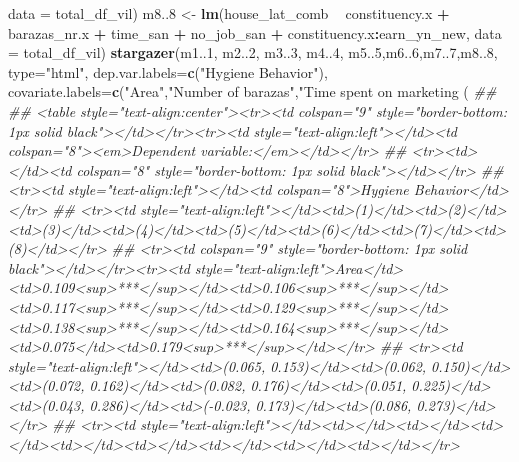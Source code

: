 \documentclass[
]{article}
\newenvironment{Shaded}{\begin{snugshade}}{\end{snugshade}}
\newcommand{\CommentTok}[1]{\textcolor[rgb]{0.56,0.35,0.01}{\textit{#1}}}
\newcommand{\DataTypeTok}[1]{\textcolor[rgb]{0.13,0.29,0.53}{#1}}
\newcommand{\DecValTok}[1]{\textcolor[rgb]{0.00,0.00,0.81}{#1}}
\newcommand{\FloatTok}[1]{\textcolor[rgb]{0.00,0.00,0.81}{#1}}
\newcommand{\KeywordTok}[1]{\textcolor[rgb]{0.13,0.29,0.53}{\textbf{#1}}}
\newcommand{\NormalTok}[1]{#1}
\newcommand{\OperatorTok}[1]{\textcolor[rgb]{0.81,0.36,0.00}{\textbf{#1}}}
\newcommand{\OtherTok}[1]{\textcolor[rgb]{0.56,0.35,0.01}{#1}}
\newcommand{\StringTok}[1]{\textcolor[rgb]{0.31,0.60,0.02}{#1}}
\begin{document}
\begin{Shaded}
\begin{Highlighting}[]
{{{{{{{{{{{{            \DataTypeTok{data =}\NormalTok{ total_df_vil)}
\NormalTok{m8..}\DecValTok{8}\NormalTok{ <-}\StringTok{ }\KeywordTok{lm}\NormalTok{(house_lat_comb }\OperatorTok{~}\StringTok{ }\NormalTok{constituency.x }\OperatorTok{+}\StringTok{ }\NormalTok{barazas_nr.x }\OperatorTok{+}\StringTok{ }\NormalTok{time_san }\OperatorTok{+}\StringTok{ }\NormalTok{no_job_san }\OperatorTok{+}\StringTok{ }\NormalTok{constituency.x}\OperatorTok{:}\NormalTok{earn_yn_new,}
            \DataTypeTok{data =}\NormalTok{ total_df_vil)}
\KeywordTok{stargazer}\NormalTok{(m1..}\DecValTok{1}\NormalTok{, m2..}\DecValTok{2}\NormalTok{, m3..}\DecValTok{3}\NormalTok{, m4..}\DecValTok{4}\NormalTok{, m5..}\DecValTok{5}\NormalTok{,m6..}\DecValTok{6}\NormalTok{,m7..}\DecValTok{7}\NormalTok{,m8..}\DecValTok{8}\NormalTok{, }\DataTypeTok{type=}\StringTok{"html"}\NormalTok{,}
          \DataTypeTok{dep.var.labels=}\KeywordTok{c}\NormalTok{(}\StringTok{"Hygiene Behavior"}\NormalTok{),}
          \DataTypeTok{covariate.labels=}\KeywordTok{c}\NormalTok{(}\StringTok{"Area"}\NormalTok{,}\StringTok{"Number of barazas"}\NormalTok{,}\StringTok{"Time spent on marketing (%)"}\NormalTok{,}\StringTok{"Main job"}\NormalTok{, }\StringTok{"Earnings"}\NormalTok{), }\DataTypeTok{ci=}\OtherTok{TRUE}\NormalTok{, }\DataTypeTok{ci.level=}\FloatTok{0.95}\NormalTok{, }\DataTypeTok{out=}\StringTok{"modelsIndiviInteraction100.htm"}\NormalTok{)}
\CommentTok{## }
\CommentTok{## <table style="text-align:center"><tr><td colspan="9" style="border-bottom: 1px solid black"></td></tr><tr><td style="text-align:left"></td><td colspan="8"><em>Dependent variable:</em></td></tr>}
\CommentTok{## <tr><td></td><td colspan="8" style="border-bottom: 1px solid black"></td></tr>}
\CommentTok{## <tr><td style="text-align:left"></td><td colspan="8">Hygiene Behavior</td></tr>}
\CommentTok{## <tr><td style="text-align:left"></td><td>(1)</td><td>(2)</td><td>(3)</td><td>(4)</td><td>(5)</td><td>(6)</td><td>(7)</td><td>(8)</td></tr>}
\CommentTok{## <tr><td colspan="9" style="border-bottom: 1px solid black"></td></tr><tr><td style="text-align:left">Area</td><td>0.109<sup>***</sup></td><td>0.106<sup>***</sup></td><td>0.117<sup>***</sup></td><td>0.129<sup>***</sup></td><td>0.138<sup>***</sup></td><td>0.164<sup>***</sup></td><td>0.075</td><td>0.179<sup>***</sup></td></tr>}
\CommentTok{## <tr><td style="text-align:left"></td><td>(0.065, 0.153)</td><td>(0.062, 0.150)</td><td>(0.072, 0.162)</td><td>(0.082, 0.176)</td><td>(0.051, 0.225)</td><td>(0.043, 0.286)</td><td>(-0.023, 0.173)</td><td>(0.086, 0.273)</td></tr>}
\CommentTok{## <tr><td style="text-align:left"></td><td></td><td></td><td></td><td></td><td></td><td></td><td></td><td></td></tr>}
}}}}}}}}}}}}}
\end{Highlighting}
\end{Shaded}
\end{document}
